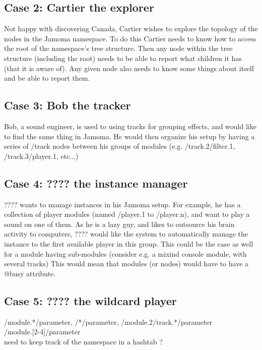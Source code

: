 \documentclass[]{article}
\begin{document}
\subsection{Case 2: Cartier the explorer}

Not happy with discovering Canada, Cartier wishes to explore the topology of the nodes in the Jamoma namespace.  To do this Cartier needs to know how to access the root of the namespace's tree structure.  Then any node within the tree structure (including the root) needs to be able to report what children it has (that it is aware of).  Any given node also needs to know some things about itself and be able to report them.

\subsection{Case 3: Bob the tracker}
Bob, a sound engineer, is used to using tracks for grouping effects, and would like to find the same thing in Jamoma. He would then organize his setup by having a series of /track nodes between his groups of modules (e.g. /track.2/filter.1, /track.3/player.1, etc...)

\subsection{Case 4: ???? the instance manager}
???? wants to manage instances in his Jamoma setup. For example, he has a collection of player modules (named /player.1 to /player.n), and want to play a sound on one of them. As he is a lazy guy, and likes to outsource his brain activity to computers, ???? would like the system to automatically manage the instance to the first available player in this group. This could be the case as well for a module having sub-modules (consider e.g. a mixind console module, with several tracks) This would mean that modules (or nodes) would have to have a @busy attribute. 

\subsection{Case 5: ???? the wildcard player}
/module.*/parameter, /*/parameter, /module.2/track.*/parameter\\
/module.[2-4]/parameter\\
need to keep track of the namespace in a hashtab ?




\end{document}
